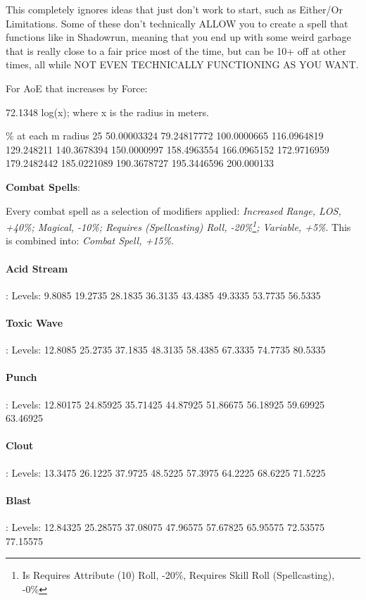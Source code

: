 \begin{multicols*}{2}
	This completely ignores ideas that just don't work to start, such as Either/Or Limitations. Some of these don't technically ALLOW you to create a spell that functions like in Shadowrun, meaning that you end up with some weird garbage that is really close to a fair price most of the time, but can be 10+ off at other times, all while NOT EVEN TECHNICALLY FUNCTIONING AS YOU WANT.
	
	For AoE that increases by Force:
	
	72.1348 log(x); where x is the radius in meters.
	
	
	\% at each m radius
	25
	50.00003324
	79.24817772
	100.0000665
	116.0964819
	129.248211
	140.3678394
	150.0000997
	158.4963554
	166.0965152
	172.9716959
	179.2482442
	185.0221089
	190.3678727
	195.3446596
	200.000133
	
	\textbf{Combat Spells}:
	
	Every combat spell as a selection of modifiers applied: \textit{Increased Range, LOS, +40\%; Magical, -10\%; Requires (Spellcasting) Roll, -20\%\footnote{Is Requires Attribute (10) Roll, -20\%, Requires Skill Roll (Spellcasting), -0\%}; Variable, +5\%}. This is combined into: \textit{Combat Spell, +15\%}.
	
	\paragraph{Acid Stream}: Levels: 9.8085 19.2735 28.1835 36.3135 43.4385 49.3335 53.7735 56.5335
	
	\paragraph{Toxic Wave}: Levels: 12.8085 25.2735 37.1835 48.3135 58.4385 67.3335 74.7735 80.5335
	
	\paragraph{Punch}: Levels: 12.80175 24.85925 35.71425 44.87925 51.86675 56.18925 59.69925 63.46925
	
	\paragraph{Clout}: Levels: 13.3475 26.1225 37.9725 48.5225 57.3975 64.2225 68.6225 71.5225
	
	\paragraph{Blast}: 	Levels: 12.84325 25.28575 37.08075 47.96575 57.67825 65.95575 72.53575 77.15575
	

\end{multicols*}
